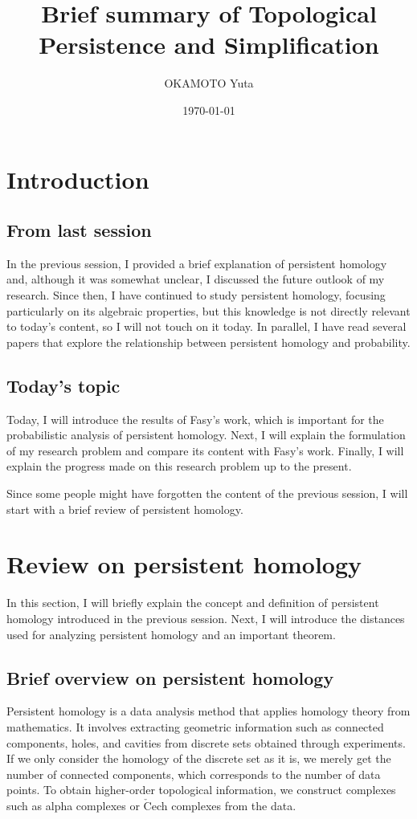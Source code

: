 \documentclass[dvipdfmx,11pt,notheorems]{article}
\title{Brief summary of Topological Persistence and Simplification}
\author{OKAMOTO Yuta}
\date{\today}
\begin{document}
\maketitle
\tableofcontents

\section{Introduction}

\subsection{From last session}

In the previous session, I provided a brief explanation of persistent homology and, although it was somewhat unclear, I discussed the future outlook of my research. Since then, I have continued to study persistent homology, focusing particularly on its algebraic properties, but this knowledge is not directly relevant to today's content, so I will not touch on it today. In parallel, I have read several papers that explore the relationship between persistent homology and probability.

\subsection{Today's topic}

Today, I will introduce the results of Fasy's work\cite{confidence-sets-for-persistence-diagrams}, which is important for the probabilistic analysis of persistent homology. Next, I will explain the formulation of my research problem and compare its content with Fasy's work. Finally, I will explain the progress made on this research problem up to the present.

Since some people might have forgotten the content of the previous session, I will start with a brief review of persistent homology.

\section{Review on persistent homology}

In this section, I will briefly explain the concept and definition of persistent homology introduced in the previous session. Next, I will introduce the distances used for analyzing persistent homology and an important theorem.

\subsection{Brief overview on persistent homology}
Persistent homology is a data analysis method that applies homology theory from mathematics. It involves extracting geometric information such as connected components, holes, and cavities from discrete sets obtained through experiments. If we only consider the homology of the discrete set as it is, we merely get the number of connected components, which corresponds to the number of data points. To obtain higher-order topological information, we construct complexes such as alpha complexes or $\check{\mathrm{C}}$ech complexes from the data.
\end{document}

